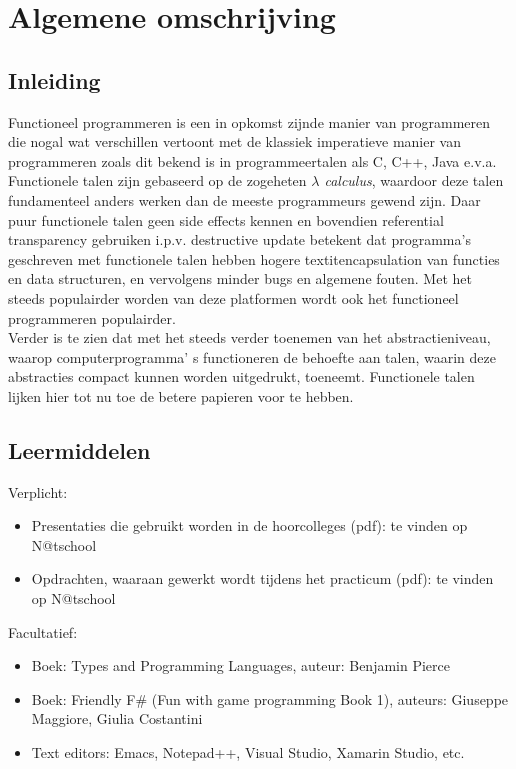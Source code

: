 \section{Algemene omschrijving}
	\subsection{Inleiding}
		Functioneel programmeren is een in opkomst zijnde manier van programmeren die nogal wat verschillen vertoont met de klassiek imperatieve manier van programmeren zoals dit bekend is in programmeertalen als C, C++, Java e.v.a. \\ 

		Functionele talen zijn gebaseerd op de zogeheten \emph{$\lambda$ calculus}, waardoor deze talen fundamenteel anders werken dan de meeste programmeurs gewend zijn. Daar puur functionele talen geen side effects kennen en bovendien referential transparency gebruiken i.p.v. destructive update betekent dat programma's geschreven met functionele talen hebben hogere textit{encapsulation} van functies en data structuren, en vervolgens minder bugs en algemene fouten. Met het steeds populairder worden van deze platformen wordt ook het functioneel programmeren populairder. \\

		Verder is te zien dat met het steeds verder toenemen van het abstractieniveau, waarop computerprogramma' s functioneren de behoefte aan talen, waarin deze abstracties compact kunnen worden uitgedrukt, toeneemt. Functionele talen lijken hier tot nu toe de betere papieren voor te hebben.\\

	\subsection{Leermiddelen}
		Verplicht:
		\begin{itemize}
			\item Presentaties die gebruikt worden in de hoorcolleges (pdf): te vinden op N@tschool
			\item Opdrachten, waaraan gewerkt wordt tijdens het practicum (pdf): te vinden op N@tschool
		\end{itemize}
		Facultatief:
		\begin{itemize}
			\item Boek: Types and Programming Languages, auteur: Benjamin Pierce
			\item Boek: Friendly F\# (Fun with game programming Book 1), auteurs: Giuseppe Maggiore, Giulia Costantini
			\item Text editors: Emacs, Notepad++, Visual Studio, Xamarin Studio, etc.
		\end{itemize}